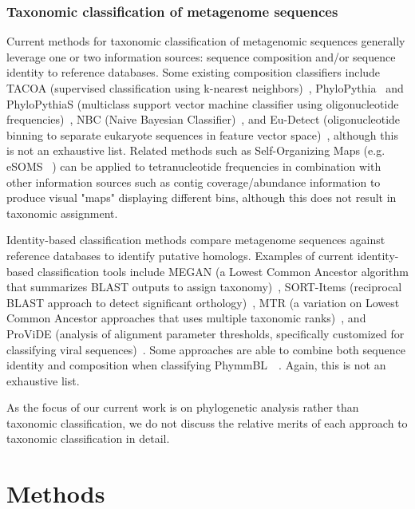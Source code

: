 \documentclass[10pt]{article}
\begin{document}
\subsubsection*{Taxonomic classification of metagenome sequences}
Current methods for taxonomic classification of metagenomic sequences generally leverage one or two information sources: sequence composition and/or sequence identity to reference databases. 
Some existing composition classifiers include TACOA (supervised classification using k-nearest neighbors)~\cite{Diaz2009}, PhyloPythia~\cite{Mchardy2006} and PhyloPythiaS (multiclass support vector machine classifier using oligonucleotide frequencies)~\cite{Patil2011}, NBC (Naive Bayesian Classifier)~\cite{Rosen2011}, and Eu-Detect (oligonucleotide binning to separate eukaryote sequences in feature vector space)~\cite{Mohammed2011}, although this is not an exhaustive list. 
Related methods such as Self-Organizing Maps (e.g. eSOMS ~\cite {Dick2009}) can be applied to tetranucleotide frequencies in combination with other information sources such as contig coverage/abundance information to produce visual "maps" displaying different bins, although this does not result in taxonomic assignment. 

Identity-based classification methods compare metagenome sequences against reference databases to identify putative homologs. 
Examples of current identity-based classification tools include MEGAN (a Lowest Common Ancestor algorithm that summarizes BLAST outputs to assign taxonomy)~\cite{Huson2007}, SORT-Items (reciprocal BLAST approach to detect significant orthology)~\cite{Haque2009}, MTR (a variation on Lowest Common Ancestor approaches that uses multiple taxonomic ranks)~\cite{Gori2011}, and ProViDE (analysis of alignment parameter thresholds, specifically customized for classifying viral sequences)~\cite{Ghosh2011}. Some approaches are able to combine both sequence identity and composition when classifying PhymmBL~\cite{Brady2009}~\cite{Brady2011}.
Again, this is not an exhaustive list.

As the focus of our current work is on phylogenetic analysis rather than taxonomic classification, we do not discuss the relative merits of each approach to taxonomic classification in detail.


\section*{Methods}
\end{document}
